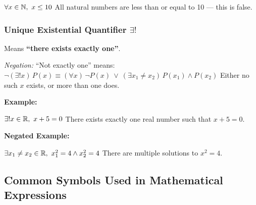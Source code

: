 \(\forall x \in \mathbb{N},\ x \leq 10\) All natural numbers are less than or equal to 10 — this is false.

\subsubsection{Unique Existential Quantifier \texorpdfstring{\(\exists ! \)}{}} 
	
Means \textbf{``there exists exactly one''}.
\vspace{\baselineskip}
		
\emph{Negation:} ``Not exactly one'' means:
\(\neg (\exists! x)\, P(x) \equiv (\forall x)\, \neg P(x)\ \lor\ (\exists x_1 \neq x_2)\, P(x_1) \land P(x_2)\) 
Either no such \( x \) exists, or more than one does.
\vspace{\baselineskip}

\textbf{Example:} 
\vspace{\baselineskip}

\(\exists! x \in \mathbb{R},\ x + 5 = 0\) There exists exactly one real number such that \( x + 5 = 0 \).
\vspace{\baselineskip}

\textbf{Negated Example:}  
\vspace{\baselineskip}

\(\exists x_1 \neq x_2 \in \mathbb{R},\ x_1^2 = 4 \land x_2^2 = 4\) There are multiple solutions to \( x^2 = 4 \).

\subsection{Common Symbols Used in Mathematical Expressions}

